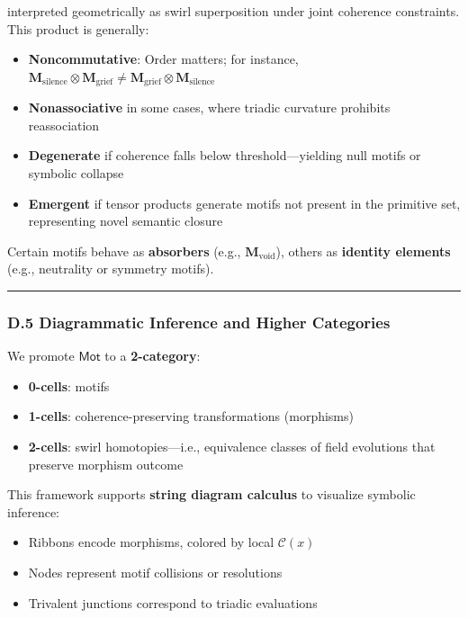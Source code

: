 \documentclass[
  11pt,
]{article}
\providecommand{\tightlist}{%
  \setlength{\itemsep}{0pt}\setlength{\parskip}{0pt}}
\begin{document}
interpreted geometrically as swirl superposition under joint coherence
constraints. This product is generally:

\begin{itemize}
\tightlist
\item
  \textbf{Noncommutative}: Order matters; for instance,
  \(\mathbf{M}_\text{silence} \otimes \mathbf{M}_\text{grief} \neq \mathbf{M}_\text{grief} \otimes \mathbf{M}_\text{silence}\)
\item
  \textbf{Nonassociative} in some cases, where triadic curvature
  prohibits reassociation
\item
  \textbf{Degenerate} if coherence falls below threshold---yielding null
  motifs or symbolic collapse
\item
  \textbf{Emergent} if tensor products generate motifs not present in
  the primitive set, representing novel semantic closure
\end{itemize}

Certain motifs behave as \textbf{absorbers} (e.g.,
\(\mathbf{M}_\text{void}\)), others as \textbf{identity elements} (e.g.,
neutrality or symmetry motifs).

\begin{center}\rule{0.5\linewidth}{0.5pt}\end{center}

\subsubsection{\texorpdfstring{\textbf{D.5 Diagrammatic Inference and
Higher
Categories}}{D.5 Diagrammatic Inference and Higher Categories}}\label{d.5-diagrammatic-inference-and-higher-categories}

We promote \(\mathsf{Mot}\) to a \textbf{2-category}:

\begin{itemize}
\tightlist
\item
  \textbf{0-cells}: motifs
\item
  \textbf{1-cells}: coherence-preserving transformations (morphisms)
\item
  \textbf{2-cells}: swirl homotopies---i.e., equivalence classes of
  field evolutions that preserve morphism outcome
\end{itemize}

This framework supports \textbf{string diagram calculus} to visualize
symbolic inference:

\begin{itemize}
\tightlist
\item
  Ribbons encode morphisms, colored by local \(\mathcal{C}(x)\)
\item
  Nodes represent motif collisions or resolutions
\item
  Trivalent junctions correspond to triadic evaluations
\end{itemize}
\end{document}
